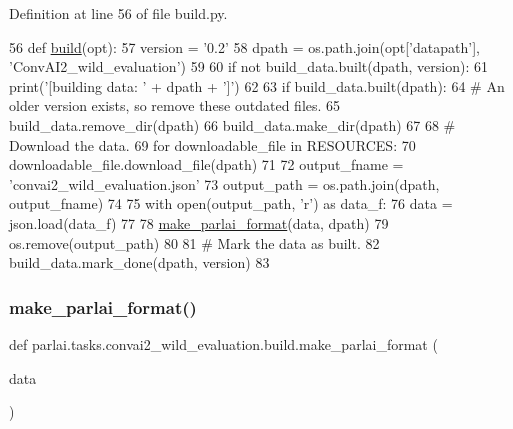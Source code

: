 Definition at line 56 of file build.\+py.


\begin{DoxyCode}
56 \textcolor{keyword}{def }\hyperlink{namespacedialog__babi__feedback_1_1build_a7a9d289f7493a5ded13c4b7f071b6184}{build}(opt):
57     version = \textcolor{stringliteral}{'0.2'}
58     dpath = os.path.join(opt[\textcolor{stringliteral}{'datapath'}], \textcolor{stringliteral}{'ConvAI2\_wild\_evaluation'})
59 
60     \textcolor{keywordflow}{if} \textcolor{keywordflow}{not} build\_data.built(dpath, version):
61         print(\textcolor{stringliteral}{'[building data: '} + dpath + \textcolor{stringliteral}{']'})
62 
63         \textcolor{keywordflow}{if} build\_data.built(dpath):
64             \textcolor{comment}{# An older version exists, so remove these outdated files.}
65             build\_data.remove\_dir(dpath)
66         build\_data.make\_dir(dpath)
67 
68         \textcolor{comment}{# Download the data.}
69         \textcolor{keywordflow}{for} downloadable\_file \textcolor{keywordflow}{in} RESOURCES:
70             downloadable\_file.download\_file(dpath)
71 
72         output\_fname = \textcolor{stringliteral}{'convai2\_wild\_evaluation.json'}
73         output\_path = os.path.join(dpath, output\_fname)
74 
75         with open(output\_path, \textcolor{stringliteral}{'r') as data\_f:}
76 \textcolor{stringliteral}{            data = json.load(data\_f)}
77 \textcolor{stringliteral}{}
78 \textcolor{stringliteral}{        \hyperlink{namespaceparlai_1_1tasks_1_1quac_1_1build_a08c212462b5c58cde91192d35f24f0cc}{make\_parlai\_format}(data, dpath)}
79 \textcolor{stringliteral}{        os.remove(output\_path)}
80 \textcolor{stringliteral}{}
81 \textcolor{stringliteral}{        }\textcolor{comment}{# Mark the data as built.}
82         build\_data.mark\_done(dpath, version)
83 \end{DoxyCode}
\mbox{\label{namespaceparlai_1_1tasks_1_1convai2__wild__evaluation_1_1build_a6c2b84806e2cb18c6eedb72d161dec5e}} 
\subsubsection{\texorpdfstring{make\+\_\+parlai\+\_\+format()}{make\_parlai\_format()}}
{\footnotesize\ttfamily def parlai.\+tasks.\+convai2\+\_\+wild\+\_\+evaluation.\+build.\+make\+\_\+parlai\+\_\+format (\begin{DoxyParamCaption}\item[{}]{data }\end{DoxyParamCaption})}



